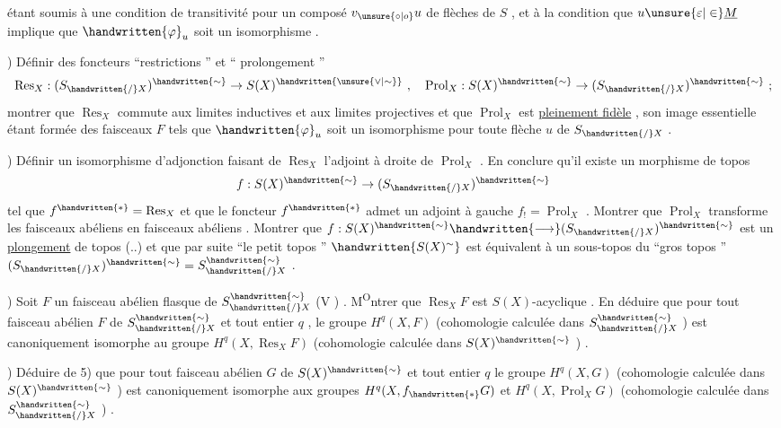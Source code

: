 étant soumis à une condition de transitivité pour un composé \(v_{\unsure{\circ|o}}u\) de flèches de \(S\) , et à la condition que \(u\unsure{\varepsilon|\in}\underline{M}\) implique que \(\handwritten{\varphi}_u\) soit un isomorphisme .

) Définir des foncteurs ``restrictions '' et `` prolongement ''
\[
\operatorname{Res}_X:(S_{\handwritten{/}X})^{\handwritten{\sim}}\to S(X)^{\handwritten{\unsure{\vee|\sim}}}\ ,\quad
\operatorname{Prol}_X:S(X)^{\handwritten{\sim}}\to(S_{\handwritten{/}X})^{\handwritten{\sim}}\ ;
\]
montrer que \(\operatorname{Res}_X\) commute aux limites inductives et aux limites projectives et que \(\operatorname{Prol}_X\) est \uline{pleinement fidèle} , son image essentielle étant formée des faisceaux \(F\) tels que \(\handwritten{\varphi}_u\) soit un isomorphisme pour toute flèche \(u\) de  \(S_{\handwritten{/}X}\) .

) Définir un isomorphisme d'adjonction faisant de \(\operatorname{Res}_X\) l'adjoint à droite de \(\operatorname{Prol}_X\) . En conclure qu'il existe un morphisme de topos
\[
f:S(X)^{\handwritten{\sim}}\to(S_{\handwritten{/}X})^{\handwritten{\sim}}
\]
tel que \(f^{\handwritten{*}}=\operatorname{Res}_X\) et que le foncteur \(f^{\handwritten{*}}\) admet un adjoint à gauche \(f_!=\operatorname{Prol}_X\) . Montrer que \(\operatorname{Prol}_X\) transforme les faisceaux abéliens en faisceaux abéliens . Montrer que \(f:S(X)^{\handwritten{\sim}}\handwritten{\longrightarrow}(S_{\handwritten{/}X})^{\handwritten{\sim}}\) est un \uline{plongement} de topos (..) et que par suite ``le petit topos '' \(\handwritten{S(X)^{\sim}}\) est  équivalent à un sous-topos du ``gros topos '' \((S_{\handwritten{/}X})^{\handwritten{\sim}}=S^{\handwritten{\sim}}_{\handwritten{/}X}\) .

) Soit \(F\) un faisceau abélien flasque de \(S^{\handwritten{\sim}}_{\handwritten{/}X}\) (V ) . M\textsuperscript{O}ntrer que \(\operatorname{Res}_X F\) est \(S(X)\)-acyclique . En déduire que pour tout faisceau abélien \(F\) de \(S^{\handwritten{\sim}}_{\handwritten{/}X}\) et tout entier \(q\) , le groupe \(H^q(X,F)\) (cohomologie calculée dans \(S^{\handwritten{\sim}}_{\handwritten{/}X}\) ) est canoniquement isomorphe au groupe \(H^q(X,\operatorname{Res}_X F)\) (cohomologie calculée dans \(S(X)^{\handwritten{\sim}}\) ) .

) Déduire de 5) que pour tout faisceau abélien \(G\)  de \(S(X)^{\handwritten{\sim}}\) et tout entier \(q\) le groupe \(H^q(X,G)\)  (cohomologie calculée dans \(S(X)^{\handwritten{\sim}}\) ) est canoniquement isomorphe aux groupes \(H^q(X,f_{\handwritten{*}}G)\) et \(H^q(X,\operatorname{Prol}_X G)\) (cohomologie calculée dans \(S^{\handwritten{\sim}}_{\handwritten{/}X}\) ) .
